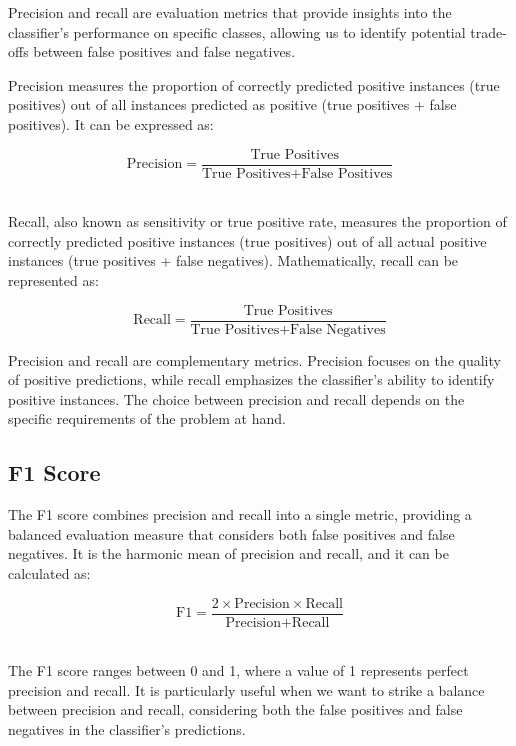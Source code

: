 Precision and recall are evaluation metrics that provide insights into
the classifier's performance on specific classes, allowing us to
identify potential trade-offs between false positives and false
negatives.

Precision measures the proportion of correctly predicted positive
instances (true positives) out of all instances predicted as positive
(true positives + false positives). It can be expressed
as:

$$\text{Precision} = \frac{ \text{True Positives }}
{\text{True Positives} + \text{False Positives}}$$
​	

Recall, also known as sensitivity or true positive rate, measures the
proportion of correctly predicted positive instances (true positives)
out of all actual positive instances (true positives + false
negatives). Mathematically, recall can be represented as:

$$ \text{Recall} = \frac{\text{True Positives}} {\text{True Positives} + \text{False Negatives}}$$


Precision and recall are complementary metrics. Precision focuses on
the quality of positive predictions, while recall emphasizes the
classifier's ability to identify positive instances. The choice
between precision and recall depends on the specific requirements of
the problem at hand.

\subsection{F1 Score}

The F1 score combines precision and recall into a single metric,
providing a balanced evaluation measure that considers both false
positives and false negatives. It is the harmonic mean of precision
and recall, and it can be calculated as:

$$\text{F1} = \frac{ 2 \times \text{Precision} \times \text{Recall}}
{\text{Precision} + \text{Recall} }$$
​	
 
The F1 score ranges between 0 and 1, where a value of 1 represents
perfect precision and recall. It is particularly useful when we want
to strike a balance between precision and recall, considering both the
false positives and false negatives in the classifier's predictions.


